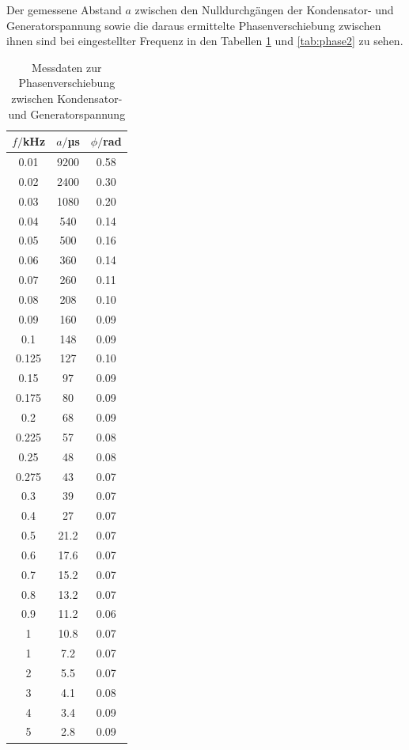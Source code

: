 Der gemessene Abstand $a$ zwischen den Nulldurchgängen der Kondensator- und Generatorspannung
sowie die daraus ermittelte Phasenverschiebung zwischen ihnen sind bei eingestellter Frequenz
in den Tabellen \ref{tab:phase1} und \ref{tab:phase2} zu sehen.

\begin{table}
\centering
\caption{Messdaten zur Phasenverschiebung zwischen Kondensator- und Generatorspannung}
\label{tab:phase1}
\begin{tabular}{c c c}
\toprule
$f/$kHz & $a/$µs & $\phi/$rad \\
\midrule
 0.01	 & 9200    & 0.58 \\
 0.02	 & 2400    & 0.30 \\
 0.03	 & 1080    & 0.20 \\
 0.04	 &  540    & 0.14 \\
 0.05	 &  500    & 0.16 \\
 0.06	 &  360    & 0.14 \\
 0.07	 &  260    & 0.11 \\
 0.08	 &  208    & 0.10 \\
 0.09	 &  160    & 0.09 \\
 0.1	 &  148    & 0.09 \\
 0.125 &  127    & 0.10 \\
 0.15	 &   97    & 0.09 \\
 0.175 &   80    & 0.09 \\
 0.2	 &   68    & 0.09 \\
 0.225 &   57    & 0.08 \\
 0.25	 &   48    & 0.08 \\
 0.275 &   43    & 0.07 \\
 0.3	 &   39    & 0.07 \\
 0.4	 &   27    & 0.07 \\
 0.5	 &   21.2  & 0.07 \\
 0.6	 &   17.6  & 0.07 \\
 0.7	 &   15.2  & 0.07 \\
 0.8	 &   13.2  & 0.07 \\
 0.9	 &   11.2  & 0.06 \\
 1	   &   10.8  & 0.07 \\
 1	   &    7.2  & 0.07 \\
 2	   &    5.5  & 0.07 \\
 3	   &    4.1  & 0.08 \\
 4	   &    3.4  & 0.09 \\
 5	   &    2.8  & 0.09 \\

\end{tabular}
\end{table}
